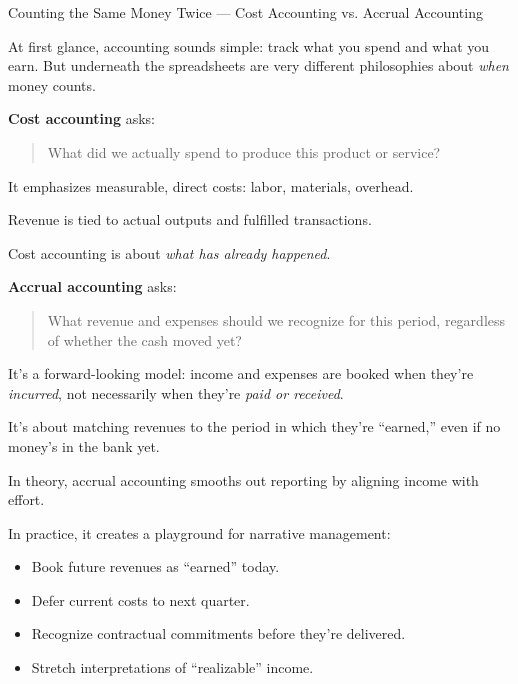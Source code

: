 \begin{HistoricalSidebar}{Counting the Same Money Twice — Cost Accounting vs. Accrual Accounting}

At first glance, accounting sounds simple: track what you spend and what you earn.  
But underneath the spreadsheets are very different philosophies about \textit{when} money counts.

\medskip

\textbf{Cost accounting} asks:  

\begin{quote}
What did we actually spend to produce this product or service?
\end{quote}

It emphasizes measurable, direct costs: labor, materials, overhead.  

\medskip

Revenue is tied to actual outputs and fulfilled transactions.  

\medskip

Cost accounting is about \textit{what has already happened}.

\medskip

\textbf{Accrual accounting} asks:  

\begin{quote}
What revenue and expenses should we recognize for this period, regardless of whether the cash moved yet?
\end{quote}

It’s a forward-looking model: income and expenses are booked when they’re \textit{incurred}, not necessarily when they’re \textit{paid or received}.  

\medskip

It’s about matching revenues to the period in which they’re “earned,” even if no money’s in the bank yet.

\medskip

In theory, accrual accounting smooths out reporting by aligning income with effort.  

\medskip

In practice, it creates a playground for narrative management:

\begin{itemize}
    \item Book future revenues as “earned” today.
    \item Defer current costs to next quarter.
    \item Recognize contractual commitments before they’re delivered.
    \item Stretch interpretations of “realizable” income.
\end{itemize}


\end{HistoricalSidebar}
